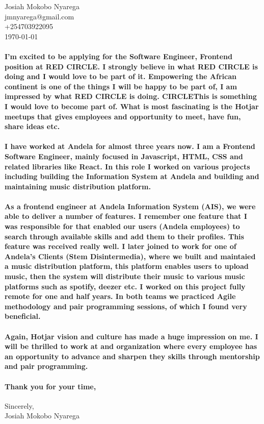 \documentclass{article}
\begin{document}
\begin{flushleft}
Josiah Mokobo Nyarega\\
jmnyarega@gmail.com\\
+254703922095\\
\today\\
\end{flushleft}

\paragraph{I'm excited to be applying for the Software Engineer, Frontend position at RED CIRCLE. I strongly believe in what RED CIRCLE is doing and I would love to be part of it. Empowering the African continent is one of the things I will be happy to be part of, I am impressed by what RED CIRCLE is doing. CIRCLEThis is something I would love to become part of. What is most fascinating is the Hotjar meetups that gives employees and opportunity to meet, have fun, share ideas etc.}

\paragraph{I have worked at Andela for almost three years now. I am a Frontend Software Engineer, mainly focused in Javascript, HTML, CSS and related libraries like React. In this role I worked on various projects including building the Information System at Andela and building and maintaining music distribution platform.}

\paragraph{As a frontend engineer at Andela Information System (AIS), we were able to deliver a number of features. I remember one feature that I was responsible for that enabled our users (Andela employees) to search through available skills and add them to their profiles. This feature was received really well. I later joined to work for one of Andela's Clients (Stem Disintermedia), where we built and maintaied a music distribution platform, this platform enables users to upload music, then the system will distribute their music to various music platforms such as spotify, deezer etc. I worked on this project fully remote for one and half years. In both teams we practiced Agile methodology and pair programming sessions, of which I found very beneficial.}

\paragraph{Again, Hotjar vision and culture has made a huge impression on me. I will be thrilled to work at and organization where every employee has an opportunity to advance and sharpen they skills through mentorship and pair programming.}

\paragraph{Thank you for your time,}

\begin{flushleft}
Sincerely,\\
Josiah Mokobo Nyarega\\
\end{flushleft}
\end{document}
